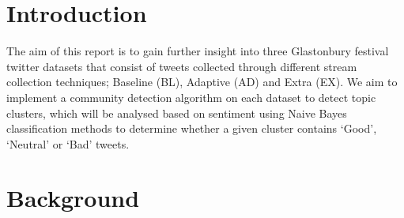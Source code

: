 \documentclass[conference]{IEEEtran}
\begin{document}
\section{Introduction}
	{
		The aim of this report is to gain further insight into three Glastonbury festival twitter datasets that consist of tweets collected through different stream collection techniques; Baseline (BL), Adaptive (AD) and Extra (EX). We aim to implement a community detection algorithm on each dataset to detect topic clusters, which will be analysed based on sentiment using Naive Bayes classification methods to determine whether a given cluster contains ‘Good’, ‘Neutral’ or ‘Bad’ tweets.
	\par}

\section{Background}
\end{document}

